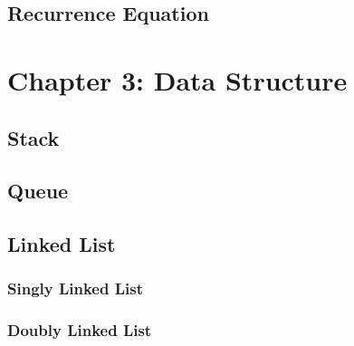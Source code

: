 \documentclass{article}
\begin{document}
\subsection{Recurrence Equation}

\section{Chapter 3: Data Structure}
\subsection{Stack}
\subsection{Queue}
\subsection{Linked List}
\subsubsection{Singly Linked List}
\subsubsection{Doubly Linked List}
\end{document}
